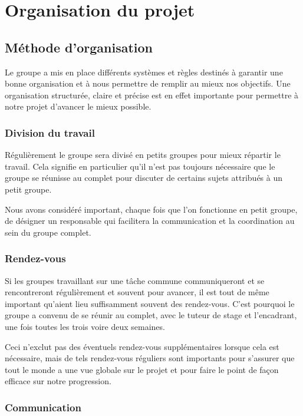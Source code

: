 \documentclass[a4paper, 12pt,twoside]{article}
\begin{document}
\section{Organisation du projet}

	\subsection{Méthode d'organisation}
	
	Le groupe a mis en place différents systèmes et règles destinés à garantir une bonne organisation et à nous permettre de remplir au mieux nos objectifs. Une organisation structurée, claire et précise est en effet importante pour permettre à notre projet d'avancer le mieux possible.
		
		\subsubsection{Division du travail}
		
		Régulièrement le groupe sera divisé en petits groupes pour mieux répartir le travail. Cela signifie en particulier qu'il n'est pas toujours nécessaire que le groupe se réunisse au complet pour discuter de certains sujets attribués à un petit groupe.
		
		Nous avons considéré important, chaque fois que l'on fonctionne en petit groupe, de désigner un responsable qui facilitera la communication et la coordination au sein du groupe complet.
		
		\subsubsection{Rendez-vous}
		
		Si les groupes travaillant sur une tâche commune communiqueront et se rencontreront régulièrement et souvent pour avancer, il est tout de même important qu'aient lieu suffisamment souvent des rendez-vous. C'est pourquoi le groupe a convenu de se réunir au complet, avec le tuteur de stage et l'encadrant, une fois toutes les trois voire deux semaines.
		
		Ceci n'exclut pas des éventuels rendez-vous supplémentaires lorsque cela est nécessaire, mais de tels rendez-vous réguliers sont importants pour s'assurer que tout le monde a une vue globale sur le projet et pour faire le point de façon efficace sur notre progression.
		
		\subsubsection{Communication}
		
\end{document}

